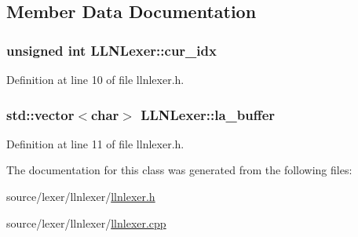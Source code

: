 \subsection{Member Data Documentation}
\hypertarget{class_l_l_n_lexer_a6cac67fbdbdc8083f87e1d0938d68ba2}{
\subsubsection[{cur\-\_\-idx}]{\setlength{\rightskip}{0pt plus 5cm}unsigned int L\-L\-N\-Lexer\-::cur\-\_\-idx\hspace{0.3cm}{\ttfamily [protected]}}}\label{class_l_l_n_lexer_a6cac67fbdbdc8083f87e1d0938d68ba2}


Definition at line 10 of file llnlexer.\-h.

\hypertarget{class_l_l_n_lexer_a6e583dda9f354ddb453c277be2cb6edc}{
\subsubsection[{la\-\_\-buffer}]{\setlength{\rightskip}{0pt plus 5cm}std\-::vector$<$char$>$ L\-L\-N\-Lexer\-::la\-\_\-buffer\hspace{0.3cm}{\ttfamily [protected]}}}\label{class_l_l_n_lexer_a6e583dda9f354ddb453c277be2cb6edc}


Definition at line 11 of file llnlexer.\-h.



The documentation for this class was generated from the following files\-:\begin{DoxyCompactItemize}
\item 
source/lexer/llnlexer/\hyperlink{llnlexer_8h}{llnlexer.\-h}\item 
source/lexer/llnlexer/\hyperlink{llnlexer_8cpp}{llnlexer.\-cpp}\end{DoxyCompactItemize}
